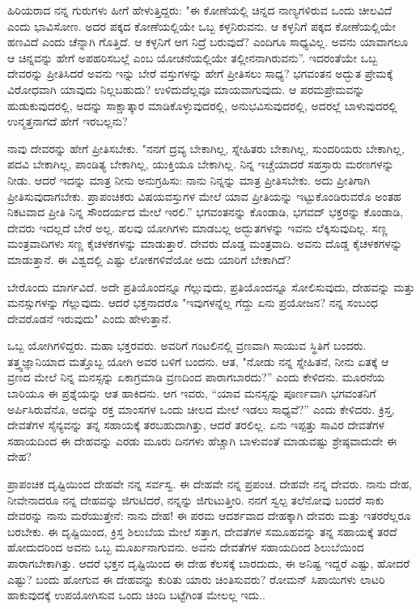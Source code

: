ಹಿರಿಯರಾದ ನನ್ನ ಗುರುಗಳು ಹೀಗೆ ಹೇಳುತ್ತಿದ್ದರು: "ಈ ಕೋಣೆಯಲ್ಲಿ ಚಿನ್ನದ ನಾಣ್ಯಗಳಿರುವ ಒಂದು ಚೀಲವಿದೆ ಎಂದು ಭಾವಿಸೋಣ. ಅದರ ಪಕ್ಕದ ಕೋಣೆಯಲ್ಲಿಯೇ ಒಬ್ಬ ಕಳ್ಳನಿರುವನು. ಆ ಕಳ್ಳನಿಗೆ ಪಕ್ಕದ ಕೋಣೆಯಲ್ಲಿಯೇ ಹಣವಿದೆ ಎಂದು ಚೆನ್ನಾಗಿ ಗೊತ್ತಿದೆ. ಆ ಕಳ್ಳನಿಗೆ ಆಗ ನಿದ್ರೆ ಬರುವುದೆ? ಎಂದಿಗೂ ಸಾಧ್ಯವಿಲ್ಲ. ಅವನು ಯಾವಾಗಲೂ ಆ ಚಿನ್ನವನ್ನು ಹೇಗೆ ಅಪಹರಿಸಬಲ್ಲೆ ಎಂಬ ಯೋಚನೆಯಲ್ಲಿಯೇ ತಲ್ಲೀನನಾಗಿರುವನು''. ಇದರಂತೆಯೇ ಒಬ್ಬ ದೇವರನ್ನು ಪ್ರೀತಿಸಿದರೆ ಅವನು ಇನ್ನು ಬೇರೆ ವಸ್ತುಗಳನ್ನು ಹೇಗೆ ಪ್ರೀತಿಸಲು ಸಾಧ್ಯ? ಭಗವಂತನ ಅದ್ಭುತ ಪ್ರೇಮಕ್ಕೆ ವಿರೋಧವಾಗಿ ಯಾವುದು ನಿಲ್ಲಬಹುದು? ಉಳಿದುದೆಲ್ಲವೂ ಮಾಯವಾಗುವುದು. ಆ ಪರಮಪ್ರೇಮವನ್ನು ಹುಡುಕುವುದರಲ್ಲಿ, ಅದನ್ನು ಸಾಕ್ಷಾತ್ಕಾರ ಮಾಡಿಕೊಳ್ಳುವುದರಲ್ಲಿ, ಅನುಭವಿಸುವುದರಲ್ಲಿ, ಅದರಲ್ಲೆ ಬಾಳುವುದರಲ್ಲಿ ಉನ್ಮತ್ತನಾಗದೆ ಹೇಗೆ ಇರಬಲ್ಲನು?

ನಾವು ದೇವರನ್ನು ಹೇಗೆ ಪ್ರೀತಿಸಬೇಕು. "ನನಗೆ ದ್ರವ್ಯ ಬೇಕಾಗಿಲ್ಲ, ಸ್ನೇಹಿತರು ಬೇಕಾಗಿಲ್ಲ, ಸುಂದರಿಯರು ಬೇಕಾಗಿಲ್ಲ, ಪದವಿ ಬೇಕಾಗಿಲ್ಲ, ಪಾಂಡಿತ್ಯ ಬೇಕಾಗಿಲ್ಲ, ಯುಕ್ತಿಯೂ ಬೇಕಾಗಿಲ್ಲ. ನಿನ್ನ ಇಚ್ಚೆಯಾದರೆ ಸಹಸ್ರಾರು ಮರಣಗಳನ್ನು ನೀಡು. ಆದರೆ ಇದನ್ನು ಮಾತ್ರ ನೀನು ಅನುಗ್ರಹಿಸು: ನಾನು ನಿನ್ನನ್ನು ಮಾತ್ರ ಪ್ರೀತಿಸಬೇಕು. ಅದು ಪ್ರೀತಿಗಾಗಿ ಪ್ರೀತಿಸುವುದಾಗಬೇಕು. ಪ್ರಾಪಂಚಿಕರು ವಿಷಯವಸ್ತುಗಳ ಮೇಲೆ ಯಾವ ಪ್ರೀತಿಯನ್ನು ಇಟ್ಟುಕೊಂಡಿರುವರೊ ಅಂತಹ ನಿಕಟವಾದ ಪ್ರೀತಿ ನಿನ್ನ ಸೌಂದರ್ಯದ ಮೇಲೆ ಇರಲಿ.” ಭಗವಂತನನ್ನು ಕೊಂಡಾಡಿ, ಭಗವದ್ ಭಕ್ತರನ್ನು ಕೊಂಡಾಡಿ, ದೇವರು ಇದಲ್ಲದೆ ಬೇರೆ ಅಲ್ಲ. ಹಲವು ಯೋಗಿಗಳು ಮಾಡಬಲ್ಲ ಅದ್ಭುತಗಳನ್ನು ಇವನು ಲೆಕ್ಕಿಸುವುದಿಲ್ಲ. ಸಣ್ಣ ಮಂತ್ರವಾದಿಗಳು ಸಣ್ಣ ಕೈಚಳಕಗಳನ್ನು ಮಾಡುತ್ತಾರೆ. ದೇವರು ದೊಡ್ಡ ಮಂತ್ರವಾದಿ. ಅವನು ದೊಡ್ಡ ಕೈಚಳಕಗಳನ್ನು ಮಾಡುತ್ತಾನೆ. ಈ ವಿಶ್ವದಲ್ಲಿ ಎಷ್ಟು ಲೋಕಗಳಿವೆಯೋ ಅದು ಯಾರಿಗೆ ಬೇಕಾಗಿದೆ?

ಬೇರೊಂದು ಮಾರ್ಗವಿದೆ. ಅದೇ ಪ್ರತಿಯೊಂದನ್ನೂ ಗೆಲ್ಲುವುದು, ಪ್ರತಿಯೊಂದನ್ನೂ ಸೋಲಿಸುವುದು, ದೇಹವನ್ನು ಮತ್ತು ಮನಸ್ಸುಗಳನ್ನು ಗೆಲ್ಲುವುದು. ಆದರೆ ಭಕ್ತನಾದರೊ "ಇವುಗಳನ್ನೆಲ್ಲ ಗೆದ್ದು ಏನು ಪ್ರಯೋಜನ? ನನ್ನ ಸಂಬಂಧ ದೇವರೊಡನೆ ಇರುವುದು" ಎಂದು ಹೇಳುತ್ತಾನೆ.

ಒಬ್ಬ ಯೋಗಿಗಳಿದ್ದರು. ಮಹಾ ಭಕ್ತರವರು. ಅವರಿಗೆ ಗಂಟಲಿನಲ್ಲಿ ವ್ರಣವಾಗಿ ಸಾಯುವ ಸ್ಥಿತಿಗೆ ಬಂದರು. ತತ್ತ್ವಜ್ಞಾನಿಯಾದ ಮತ್ತೊಬ್ಬ ಯೋಗಿ ಅವರ ಬಳಿಗೆ ಬಂದನು. ಆತ, "ನೋಡು ನನ್ನ ಸ್ನೇಹಿತನೆ, ನೀನು ಏತಕ್ಕೆ ಆ ವ್ರಣದ ಮೇಲೆ ನಿನ್ನ ಮನಸ್ಸನ್ನು ಏಕಾಗ್ರಮಾಡಿ ವ್ರಣದಿಂದ ಪಾರಾಗಬಾರದು?” ಎಂದು ಕೇಳಿದನು. ಮೂರನೆಯ ಬಾರಿಯೂ ಈ ಪ್ರಶ್ನೆಯನ್ನು ಆತ ಹಾಕಿದನು. ಆಗ ಇವರು, “ಯಾವ ಮನಸ್ಸನ್ನು ಪೂರ್ಣವಾಗಿ ಭಗವಂತನಿಗೆ ಅರ್ಪಿಸಿರುವೆನೊ, ಅದನ್ನು ರಕ್ತ ಮಾಂಸಗಳ ಒಂದು ಚೀಲದ ಮೇಲೆ ಇಡಲು ಸಾಧ್ಯವೆ?” ಎಂದು ಕೇಳಿದರು. ಕ್ರಿಸ್ತ, ದೇವತೆಗಳ ಸೈನ್ಯವನ್ನು ತನ್ನ ಸಹಾಯಕ್ಕೆ ತರಬಹುದಾಗಿತ್ತು, ಆದರೆ ತರಲಿಲ್ಲ. ಏನು ಇಪ್ಪತ್ತು ಸಾವಿರ ದೇವತೆಗಳ ಸಹಾಯದಿಂದ ಈ ದೇಹವನ್ನು ಎರಡು ಮೂರು ದಿನಗಳು ಹೆಚ್ಚಾಗಿ ಬಾಳುವಂತೆ ಮಾಡುವಷ್ಟು ಶ್ರೇಷ್ಠವಾದುದೇ ಈ ದೇಹ?

ಪ್ರಾಪಂಚಿಕ ದೃಷ್ಟಿಯಿಂದ ದೇಹವೇ ನನ್ನ ಸರ್ವಸ್ವ. ಈ ದೇಹವೇ ನನ್ನ ಪ್ರಪಂಚ. ದೇಹವೇ ನನ್ನ ದೇವರು. ನಾನು ದೇಹ, ನೀವೇನಾದರೂ ನನ್ನ ದೇಹವನ್ನು ಜಿಗುಟಿದರೆ, ನನ್ನನ್ನು ಜಿಗುಟುತ್ತೀರಿ. ನನಗೆ ಸ್ವಲ್ಪ ತಲೆನೋವು ಬಂದರೆ ಸಾಕು ದೇವರನ್ನು ನಾನು ಮರೆಯುತ್ತೇನೆ: ನಾನು ದೇಹ! ಈ ಪರಮ ಆದರ್ಶವಾದ ದೇಹಕ್ಕಾಗಿ ದೇವರು ಮತ್ತು ಇತರರೆಲ್ಲರೂ ಬರಬೇಕು. ಈ ದೃಷ್ಟಿಯಿಂದ, ಕ್ರಿಸ್ತ ಶಿಲುಬೆಯ ಮೇಲೆ ಸತ್ತಾಗ, ದೇವತೆಗಳ ಸಮೂಹವನ್ನು ತನ್ನ ಸಹಾಯಕ್ಕೆ ತರದೆ ಹೋದುದರಿಂದ ಅವನು ಒಬ್ಬ ಮೂರ್ಖನಾಗುವನು. ಅವನು ದೇವತೆಗಳ ಸಹಾಯದಿಂದ ಶಿಲುಬೆಯಿಂದ ಪಾರಾಗಬೇಕಾಗಿತ್ತು. ಆದರೆ ಭಕ್ತನ ದೃಷ್ಟಿಯಿಂದ ಈ ದೇಹ ಕೆಲಸಕ್ಕೆ ಬಾರದುದು, ಈ ಅನಿಷ್ಟ ಇದ್ದರೆ ಎಷ್ಟು, ಹೋದರೆ ಎಷ್ಟು? ಬಂದು ಹೋಗುವ ಈ ದೇಹವನ್ನು ಕುರಿತು ಯಾರು ಚಿಂತಿಸುವರು? ರೋಮನ್ ಸಿಪಾಯಿಗಳು ಲಾಟರಿ ಹಾಕುವುದಕ್ಕೆ ಉಪಯೋಗಿಸುವ ಒಂದು ಚಿಂದಿ ಬಟ್ಟೆಗಿಂತ ಮೇಲಲ್ಲ ಇದು..

